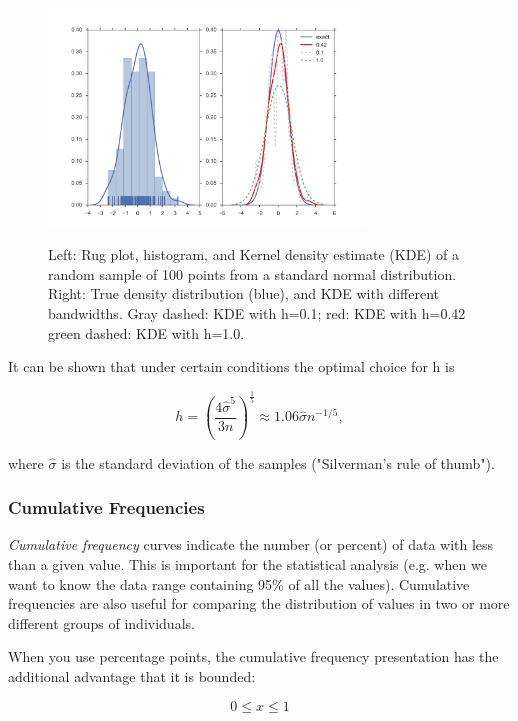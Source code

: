 \begin{figure}[ht]
  \centering
  \includegraphics[width=0.75\textwidth]{../Images/KDEplot.png}\\
  \caption{ Left: Rug plot, histogram, and Kernel density estimate (KDE) of a random sample of 100 points from a standard normal distribution. Right: True density distribution (blue), and KDE with different bandwidths. Gray dashed: KDE with h=0.1; red: KDE with h=0.42 green dashed: KDE with h=1.0.}
  \label{fig:kdeBandwidth}
\end{figure}

It can be shown that under certain conditions the optimal choice for h is

\begin{equation}
  h = \left(\frac{4\hat{\sigma}^5}{3n}\right)^{\frac{1}{5}} \approx 1.06 \hat{\sigma} n^{-1/5},
\end{equation}

where $\hat{\sigma}$ is the standard deviation of the samples ("Silverman's rule of thumb").

\subsubsection{Cumulative Frequencies}

\emph{Cumulative frequency} curves indicate the number (or percent) of data with less than a given value. This is important for the statistical analysis (e.g. when we want to know the data range containing 95\% of all the values). Cumulative frequencies
are also useful for comparing the distribution of values in two or more different groups of individuals.

When you use percentage points, the cumulative frequency presentation has the additional advantage that it is bounded:

\begin{equation*}
  0 \leq x \leq 1
\end{equation*}

